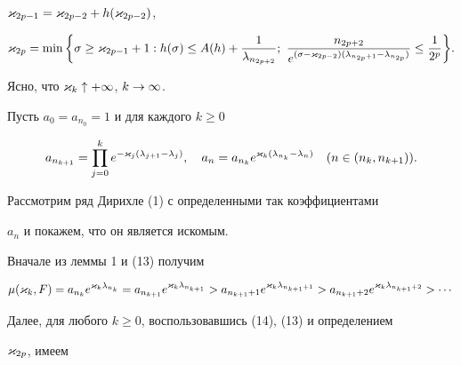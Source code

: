 $\varkappa_{2p-1}=\varkappa_{2p-2}+h(\varkappa_{2p-2})$,


$$


\k_{2p}=\min\bigg\{\s\ge


\k_{2p-1}+1:h(\s)\le A(h)+\frac1{\l_{n_{2p+2}}};\


\frac{n_{2p+2}}{ e^{(\s-\k_{2p-2}) (\l_{n_{2p}+1}-\l_{n_{2p}}) }}


\le\frac1{2^p}\bigg\}. 


$$


Ясно, что $\varkappa_k\uparrow+\infty$, $k\to\infty$.





Пусть $a_0=a_{n_0}=1$ и для каждого $k\ge 0$


\begin{equation}


a_{n_{k+1}}=\prod_{j=0}^ke^{-\k_j(\l_{j+1}-\l_j)},\q 


a_n=a_{n_k}e^{\k_k(\l_{n_k}-\l_n)}\q (n\in (n_k,n_{k+1})).


\end{equation}


Рассмотрим ряд Дирихле (1) с определенными так коэффициентами


$a_n$ и покажем, что он является искомым.





Вначале из леммы 1 и (13) получим


\begin{equation}


\mu(\k_k,F)=a_{n_k}e^{\k_k\l_{n_k}}=


a_{n_{k+1}}e^{\k_k\l_{n_{k+1}}}>


a_{n_{k+1}+1}e^{\k_k\l_{n_{k+1}+1}}>


a_{n_{k+1}+2}e^{\k_k\l_{n_{k+1}+2}}>\dotsb   


\end{equation}


Далее, для любого $k\ge 0$, воспользовавшись (14), (13) и определением


$\varkappa_{2p}$, имеем


